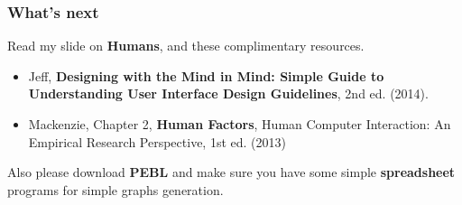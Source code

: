 \documentclass{beamer}
\begin{document}

%





\begin{frame}
\frametitle{What's next}
Read my slide on \textbf{Humans}, and these complimentary resources.  
	\begin{itemize}
		\item Jeff, \textbf{Designing with the Mind in Mind: Simple Guide to Understanding User Interface Design Guidelines}, 2nd ed. (2014).
		\item Mackenzie, Chapter 2, \textbf{Human Factors},  Human Computer Interaction: An Empirical Research Perspective, 1st ed. (2013) 
	\end{itemize}
Also please download \textbf{PEBL} and make sure you have some simple \textbf{spreadsheet} programs for simple graphs generation.
\end{frame}

\end{document}
